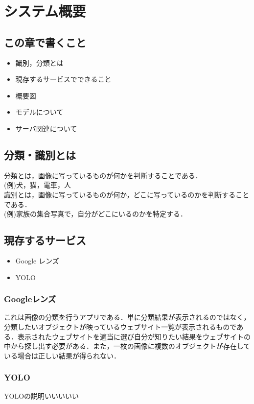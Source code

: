 

\chapter{システム概要}
\section{この章で書くこと}
\begin{itemize}
	\item 識別，分類とは
	\item 現存するサービスでできること
	\item 概要図
	\item モデルについて
	\item サーバ関連について
\end{itemize}
\section{分類・識別とは}
分類とは，画像に写っているものが何かを判断することである．\\
(例)犬，猫，電車，人\\
識別とは，画像に写っているものが何か，どこに写っているのかを判断することである．\\
(例)家族の集合写真で，自分がどこにいるのかを特定する．
\section{現存するサービス}
\begin{itemize}
	\item Google レンズ
	\item YOLO
\end{itemize}

\subsection{Googleレンズ}\label{google-service}
これは画像の分類を行うアプリである．単に分類結果が表示されるのではなく，分類したいオブジェクトが映っているウェブサイト一覧が表示されるものである．表示されたウェブサイトを適当に選び自分が知りたい結果をウェブサイトの中から探し出す必要がある．また，一枚の画像に複数のオブジェクトが存在している場合は正しい結果が得られない．

\subsection{YOLO}\label{YOLO-service}
YOLOの説明いいいいい

